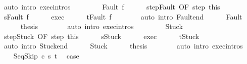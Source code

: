 \begin{isabellebody}
\ {\isacharparenleft}auto\ intro{\isacharcolon}\ exec{\isachardot}intros{\isacharparenright}\isanewline
\ \ \isamarkupfalse%
\isanewline
\ \ \ \ \isamarkupfalse%
\ {\isacharparenleft}Fault\ f{\isacharparenright}\isanewline
\ \ \ \ \isamarkupfalse%
\ step{\isacharunderscore}Fault\ {\isacharbrackleft}OF\ step\ this{\isacharbrackright}\isanewline
\ \ \ \ \isamarkupfalse%
\ {\isachardoublequoteopen}s{\isacharprime}{\isacharequal}Fault\ f{\isachardoublequoteclose}\isacommand{{\isachardot}}\isamarkupfalse%
\isanewline
\ \ \ \ \isamarkupfalse%
\ exec{\isacharprime}\isanewline
\ \ \ \ \isamarkupfalse%
\ {\isachardoublequoteopen}t{\isacharequal}Fault\ f{\isachardoublequoteclose}\isanewline
\ \ \ \ \ \ \isamarkupfalse%
\ {\isacharparenleft}auto\ intro{\isacharcolon}\ Fault{\isacharunderscore}end{\isacharparenright}\isanewline
\ \ \ \ \isamarkupfalse%
\ Fault\isanewline
\ \ \ \ \isamarkupfalse%
\ {\isacharquery}thesis\isanewline
\ \ \ \ \ \ \isamarkupfalse%
\ {\isacharparenleft}auto\ intro{\isacharcolon}\ exec{\isachardot}intros{\isacharparenright}\isanewline
\ \ \isamarkupfalse%
\isanewline
\ \ \ \ \isamarkupfalse%
\ Stuck\isanewline
\ \ \ \ \isamarkupfalse%
\ step{\isacharunderscore}Stuck\ {\isacharbrackleft}OF\ step\ this{\isacharbrackright}\isanewline
\ \ \ \ \isamarkupfalse%
\ {\isachardoublequoteopen}s{\isacharprime}{\isacharequal}Stuck{\isachardoublequoteclose}\isacommand{{\isachardot}}\isamarkupfalse%
\isanewline
\ \ \ \ \isamarkupfalse%
\ exec{\isacharprime}\isanewline
\ \ \ \ \isamarkupfalse%
\ {\isachardoublequoteopen}t{\isacharequal}Stuck{\isachardoublequoteclose}\isanewline
\ \ \ \ \ \ \isamarkupfalse%
\ {\isacharparenleft}auto\ intro{\isacharcolon}\ Stuck{\isacharunderscore}end{\isacharparenright}\isanewline
\ \ \ \ \isamarkupfalse%
\ Stuck\isanewline
\ \ \ \ \isamarkupfalse%
\ {\isacharquery}thesis\isanewline
\ \ \ \ \ \ \isamarkupfalse%
\ {\isacharparenleft}auto\ intro{\isacharcolon}\ exec{\isachardot}intros{\isacharparenright}\isanewline
\ \ \isamarkupfalse%
\isanewline
{}\isamarkupfalse%
\isanewline
\ \ \isamarkupfalse%
\ {\isacharparenleft}SeqSkip\ c\ s\ t{\isacharparenright}\ \isamarkupfalse%
\ {\isacharquery}case\isanewline
\ \ \ \ \isamarkupfalse%

\end{isabellebody}
